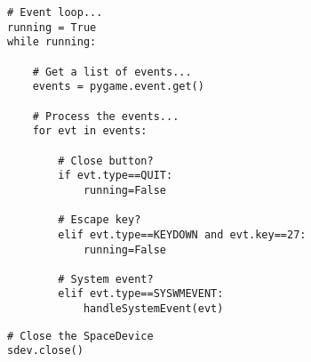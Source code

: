 \begin{verbatim}
# Event loop...
running = True
while running:

    # Get a list of events...
    events = pygame.event.get()

    # Process the events...
    for evt in events:

        # Close button?
        if evt.type==QUIT:
            running=False

        # Escape key?
        elif evt.type==KEYDOWN and evt.key==27:
            running=False

        # System event?
        elif evt.type==SYSWMEVENT:
            handleSystemEvent(evt)
\end{verbatim}
            
\begin{verbatim}
# Close the SpaceDevice
sdev.close()
\end{verbatim}